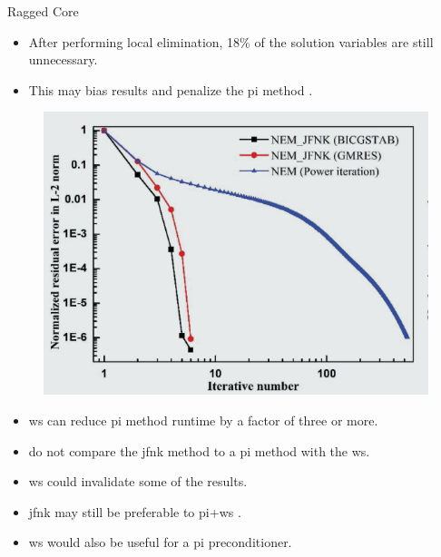 \begin{frame}{Ragged Core}
  \begin{itemize}
    \item After performing local elimination, 18\% of the solution variables are
      still unnecessary.
    \item This may bias results and penalize the \gls{pi} method
      \cite{gehinThesis}.
  \end{itemize}
  \begin{figure}
    \centering
    \includegraphics{./figs/iaea3d_convergence.png}
  \end{figure}
\end{frame}

\begin{frame}{}
  \begin{itemize}
    \item \gls{ws} can reduce \gls{pi} method runtime by a factor of three or
      more.
    \item \citeauthor{qe2paper} do not compare the \gls{jfnk} method to a
      \gls{pi} method with the \gls{ws}.
    \item \gls{ws} could invalidate some of the results.
    \item \gls{jfnk} may still be preferable to \gls{pi}+\gls{ws} \cite{jfnk_wielandt}.
    \item \gls{ws} would also be useful for a \gls{pi} preconditioner.
  \end{itemize}
\end{frame}
